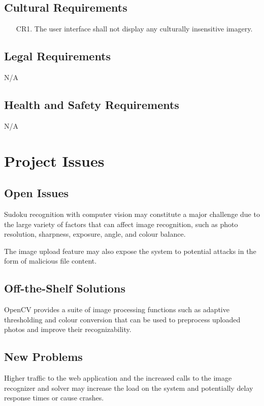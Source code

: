 \documentclass[11pt]{article}
\begin{document}
\subsection{Cultural Requirements}

\begin{enumerate}
    \item [CR1.] The user interface shall not display any culturally insensitive imagery.
\end{enumerate}

\subsection{Legal Requirements}

N/A

\subsection{Health and Safety Requirements}

N/A

\section{Project Issues}

\subsection{Open Issues}
Sudoku recognition with computer vision may constitute a major challenge due to the large variety of factors that can affect image recognition, such as photo resolution, sharpness, exposure, angle, and colour balance. 

\noindent The image upload feature may also expose the system to potential attacks in the form of malicious file content.

\subsection{Off-the-Shelf Solutions}
OpenCV provides a suite of image processing functions such as adaptive thresholding and colour conversion that can be used to preprocess uploaded photos and improve their recognizability. 

\subsection{New Problems}
Higher traffic to the web application and the increased calls to the image recognizer and solver may increase the load on the system and potentially delay response times or cause crashes.
\end{document}
